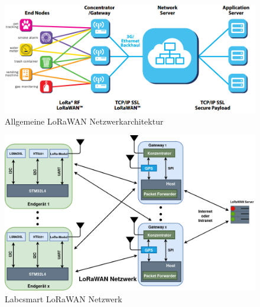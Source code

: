 \vspace{2cm}
\begin{figure}[h]
	\centering
	\includegraphics[width=15cm]{source/images/LoRaWAN_NET}
	\caption{Allgemeine LoRaWAN Netzwerkarchitektur 
	\cite{LoRaWAN}\label{fig:LRWAN}}
\end{figure}


\begin{figure}[h]
	\centering
	\includegraphics[width=15cm]{source/images/Gesamtsystem}
	\caption{Labcsmart LoRaWAN Netzwerk \label{fig:LabcsmartLoRawan}}
\end{figure}

